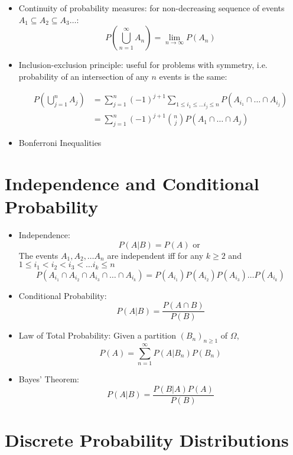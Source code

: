 \begin{itemize}
      \item Continuity of probability measures: for non-decreasing sequence of events $A_1 \subseteq A_2 \subseteq A_3 \dots $:
            \[ P \left( \bigcup_{n=1}^{\infty}A_n \right) = \lim_{n \to \infty} P(A_n)\]

      \item Inclusion-exclusion principle: useful for problems with symmetry, i.e. probability of an intersection of any $n$ events is the same:

            \begin{align*}
                  P \left(\bigcup_{j=1}^{n} A_j \right)
                   & = \sum_{j=1}^{n} (-1)^{j+1} \sum_{1 \leq i_1 \leq \dots i_j \leq n} P(A_{i_1} \cap \dots \cap A_{i_j}) \\
                   & = \sum_{j=1}^{n} (-1)^{j+1} {n \choose j} P(A_1 \cap \dots \cap A_j)
            \end{align*}

      \item Bonferroni Inequalities

\end{itemize}


\section{Independence and Conditional Probability}
\begin{itemize}
      \item Independence:
            \[P(A|B) = P(A) \text{ or } \]
            The events $A_1, A_2, \dots A_n$ are independent iff for any $k\geq 2$ and $ 1 \leq i_1 < i_2 < i_3 < \dots i_k \leq n $
            \[ P(A_{i_1} \cap A_{i_2} \cap A_{i_3} \cap \dots \cap A_{i_k}) =  P(A_{i_1}) P(A_{i_2}) P(A_{i_3}) \dots P(A_{i_k}) \]

      \item Conditional Probability:
            \[P(A|B) = \frac{P(A\cap B)}{P(B)}\]
      \item Law of Total Probability: Given a partition $(B_n)_{n\geq 1}$ of $\Omega$, \[P(A) = \sum_{n=1}^{\infty} P(A|B_n) P(B_n)\]
      \item Bayes' Theorem:
            \[P(A|B) = \frac{P(B|A)P(A)}{P(B)}\]
\end{itemize}

\section{Discrete Probability Distributions}

